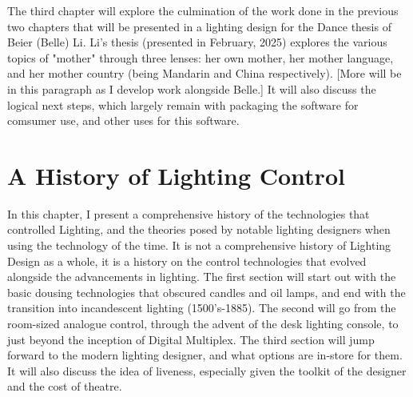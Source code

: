\documentclass[12pt,twoside]{reedthesis}
\begin{document}
    The third chapter will explore the culmination of the work done in the previous two chapters that will be presented in a lighting design for the Dance thesis of Beier (Belle) Li. Li's thesis (presented in February, 2025) explores the various topics of "mother" through three lenses: her own mother, her mother language, and her mother country (being Mandarin and China respectively). [More will be in this paragraph as I develop work alongside Belle.] It will also discuss the logical next steps, which largely remain with packaging the software for comsumer use, and other uses for this software.
	
\chapter{A History of Lighting Control}
In this chapter, I present a comprehensive history of the technologies that controlled Lighting, and the theories posed by notable lighting designers when using the technology of the time. It is not a comprehensive history of Lighting Design as a whole, it is a history on the control technologies that evolved alongside the advancements in lighting. The first section will start out with the basic dousing technologies that obscured candles and oil lamps, and end with the transition into incandescent lighting (1500's-1885). The second will go from the room-sized analogue control, through the advent of the desk lighting console, to just beyond the inception of Digital Multiplex. The third section will jump forward to the modern lighting designer, and what options are in-store for them. It will also discuss the idea of liveness, especially given the toolkit of the designer and the cost of theatre.
\end{document}
